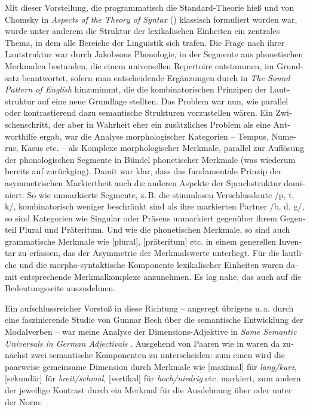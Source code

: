\documentclass[output=paper,colorlinks,citecolor=brown]{langscibook}
\begin{document}
\begin{otherlanguage}{german}
Mit dieser Vorstellung, die programmatisch die \glqq Standard-Theorie\grqq{} hieß und von Chomsky in \textit{Aspects of the Theory of Syntax} (\citeyear{Chomsky1965}) klassisch formuliert worden war, wurde unter anderem die Struktur der lexikalischen Einheiten ein zentrales Thema, in dem alle Bereiche der Linguistik sich trafen. Die Frage nach ihrer Lautstruktur war durch Jakobsons Phonologie, in der Segmente aus phonetischen Merkmalen bestanden, die einem universellen Repertoire entstammen, im Grundsatz beantwortet, sofern man entscheidende Ergänzungen durch \citet{ChomskyHalle1968} in \textit{The Sound Pattern of English} hinzunimmt, die die kombinatorischen Prinzipen der Lautstruktur auf eine neue Grundlage stellten. Das Problem war nun, wie parallel oder kontrastierend dazu semantische Strukturen vorzustellen wären. Ein Zwischenschritt, der aber in Wahrheit eher ein zusätzliches Problem als eine Antworthilfe ergab, war die Analyse morphologischer Kategorien -- Tempus, Numerus, Kasus etc. -- als Komplexe morphologischer Merkmale, parallel zur Auflösung der phonologischen Segmente in Bündel phonetischer Merkmale (was wiederum bereits auf \citealt{Jakobson1932} zurückging). Damit war klar, dass das fundamentale Prinzip der asymmetrischen Markiertheit auch die anderen Aspekte der Sprachstruktur dominiert: So wie unmarkierte Segmente, z.\,B. die stimmlosen Verschlusslaute /p, t, k/, kombinatorisch weniger beschränkt sind als ihre markierten Partner /b, d, g/, so sind Kategorien wie Singular oder Präsens unmarkiert gegenüber ihrem Gegenteil Plural und Präteritum. Und wie die phonetischen Merkmale, so sind auch grammatische Merkmale wie [plural], [präteritum] etc. in einem generellen Inventar zu erfassen, das der Asymmetrie der Merkmalswerte unterliegt. Für die lautliche und die morpho-syntaktische Komponente lexikalischer Einheiten waren damit entsprechende Merkmalkomplexe anzunehmen. Es lag nahe, das auch auf die Bedeutungsseite auszudehnen.

Ein aufschlussreicher Vorstoß in diese Richtung -- angeregt übrigens u.\,a. durch eine faszinierende Studie von Gunnar Bech %
über die semantische Entwicklung der Modalverben \citep{Bech1951} %
-- war meine Analyse der Dimensions-Adjektive in \textit{Some Semantic Universals in German Adjectivals}  \citep{Bierwisch1967}%
. Ausgehend von Paaren wie in  waren da zunächst zwei semantische Komponenten zu unterscheiden: zum einen wird die paarweise gemeinsame Dimension durch Merkmale wie [maximal] für \textit{lang/kurz}, [sekundär] für \textit{breit/schmal}, [vertikal] für \textit{hoch/niedrig} etc. markiert, zum andern der jeweilige Kontrast durch ein Merkmal für die Ausdehnung über oder unter der Norm:


\end{otherlanguage}
\end{document}
